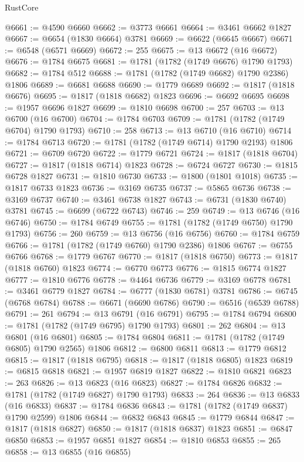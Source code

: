 \begin{lexlean}{RustCore}
\begin{coremodule}
@6661 := @4590 @6660
@6662 := @3773 @6661
@6664 := @3461 @6662 @1827
@6667 := @6654 (@1830 @6664) @3781
@6669 := @6622 (@6645 @6667)
@6671 := @6548 (@6571 @6669)
@6672 := 255
@6675 := @13 @6672 (@16 @6672)
@6676 := @1784 @6675
@6681 := @1781 (@1782 (@1749 @6676) @1790 @1793)
@6682 := @1784 @512
@6688 := @1781 (@1782 (@1749 @6682) @1790 @2386) @1806
@6689 := @6681 @6688
@6690 := @1779 @6689
@6692 := @1817 (@1818 @6676)
@6695 := @1817 (@1818 @6682) @1823
@6696 := @6692 @6695
@6698 := @1957 @6696 @1827
@6699 := @1810 @6698
@6700 := 257
@6703 := @13 @6700 (@16 @6700)
@6704 := @1784 @6703
@6709 := @1781 (@1782 (@1749 @6704) @1790 @1793)
@6710 := 258
@6713 := @13 @6710 (@16 @6710)
@6714 := @1784 @6713
@6720 := @1781 (@1782 (@1749 @6714) @1790 @2193) @1806
@6721 := @6709 @6720
@6722 := @1779 @6721
@6724 := @1817 (@1818 @6704)
@6727 := @1817 (@1818 @6714) @1823
@6728 := @6724 @6727
@6730 := @1815 @6728 @1827
@6731 := @1810 @6730
@6733 := @1800 (@1801 @1018)
@6735 := @1817 @6733 @1823
@6736 := @3169 @6735
@6737 := @5865 @6736
@6738 := @3169 @6737
@6740 := @3461 @6738 @1827
@6743 := @6731 (@1830 @6740) @3781
@6745 := @6699 (@6722 @6743)
@6746 := 259
@6749 := @13 @6746 (@16 @6746)
@6750 := @1784 @6749
@6755 := @1781 (@1782 (@1749 @6750) @1790 @1793)
@6756 := 260
@6759 := @13 @6756 (@16 @6756)
@6760 := @1784 @6759
@6766 := @1781 (@1782 (@1749 @6760) @1790 @2386) @1806
@6767 := @6755 @6766
@6768 := @1779 @6767
@6770 := @1817 (@1818 @6750)
@6773 := @1817 (@1818 @6760) @1823
@6774 := @6770 @6773
@6776 := @1815 @6774 @1827
@6777 := @1810 @6776
@6778 := @4464 @6736
@6779 := @3169 @6778
@6781 := @3461 @6779 @1827
@6784 := @6777 (@1830 @6781) @3781
@6786 := @6745 (@6768 @6784)
@6788 := @6671 (@6690 @6786)
@6790 := @6516 (@6539 @6788)
@6791 := 261
@6794 := @13 @6791 (@16 @6791)
@6795 := @1784 @6794
@6800 := @1781 (@1782 (@1749 @6795) @1790 @1793)
@6801 := 262
@6804 := @13 @6801 (@16 @6801)
@6805 := @1784 @6804
@6811 := @1781 (@1782 (@1749 @6805) @1790 @2565) @1806
@6812 := @6800 @6811
@6813 := @1779 @6812
@6815 := @1817 (@1818 @6795)
@6818 := @1817 (@1818 @6805) @1823
@6819 := @6815 @6818
@6821 := @1957 @6819 @1827
@6822 := @1810 @6821
@6823 := 263
@6826 := @13 @6823 (@16 @6823)
@6827 := @1784 @6826
@6832 := @1781 (@1782 (@1749 @6827) @1790 @1793)
@6833 := 264
@6836 := @13 @6833 (@16 @6833)
@6837 := @1784 @6836
@6843 := @1781 (@1782 (@1749 @6837) @1790 @2599) @1806
@6844 := @6832 @6843
@6845 := @1779 @6844
@6847 := @1817 (@1818 @6827)
@6850 := @1817 (@1818 @6837) @1823
@6851 := @6847 @6850
@6853 := @1957 @6851 @1827
@6854 := @1810 @6853
@6855 := 265
@6858 := @13 @6855 (@16 @6855)

\end{coremodule}
\end{lexlean}
